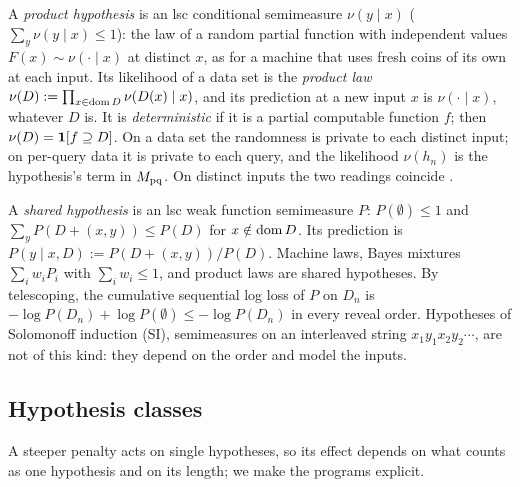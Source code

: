 \begin{definition}\label{def:setup:product}
A \emph{product hypothesis} is an lsc conditional semimeasure $\nu(y\mid x)$ ($\sum_y\nu(y\mid x)\le1$): the law of a random partial function with independent values $F(x)\sim\nu(\cdot\mid x)$ at distinct $x$, as for a machine that uses fresh coins of its own at each input. Its likelihood of a data set is the \emph{product law} $\nu(D):=\prod_{x\in\operatorname{dom} D}\nu(D(x)\mid x)$, and its prediction at a new input $x$ is $\nu(\cdot\mid x)$, whatever $D$ is. It is \emph{deterministic} if it is a partial computable function $f$; then $\nu(D)=\mathbf{1}[f\supseteq D]$. On a data set the randomness is private to each distinct input; on per-query data it is private to each query, and the likelihood $\nu(h_n)$ is the hypothesis's term in $M_{\mathrm{pq}}$. On distinct inputs the two readings coincide \citep[Proposition~5.7(a)]{claudeSFI2026fundamentals}.%
\end{definition}

\begin{definition}\label{def:setup:shared}
A \emph{shared hypothesis} is an lsc weak function semimeasure $P$: $P(\emptyset)\le1$ and $\sum_yP(D+(x,y))\le P(D)$ for $x\notin\operatorname{dom} D$. Its prediction is $P(y\mid x,D):=P(D+(x,y))/P(D)$. Machine laws, Bayes mixtures $\sum_iw_iP_i$ with $\sum_iw_i\le1$, and product laws are shared hypotheses. By telescoping, the cumulative sequential log loss of $P$ on $D_n$ is $-\log P(D_n)+\log P(\emptyset)\le-\log P(D_n)$ in every reveal order. Hypotheses of Solomonoff induction (SI), semimeasures on an interleaved string $x_1y_1x_2y_2\cdots$, are not of this kind: they depend on the order and model the inputs.
\end{definition}

\subsection{Hypothesis classes}\label{sec:setup:classes}

A steeper penalty acts on single hypotheses, so its effect depends on what counts as one hypothesis and on its length; we make the programs explicit.

